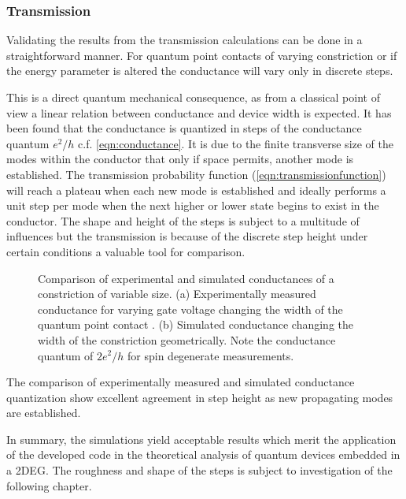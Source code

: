 \subsubsection{Transmission}
Validating the results from the transmission calculations can be done in a straightforward manner. For quantum point contacts of varying constriction or if the energy parameter is altered the conductance will vary only in discrete steps.\par
This is a direct quantum mechanical consequence, as from a classical point of view a linear relation between conductance and device width is expected.
It has been found that the conductance is quantized in steps of the conductance quantum $e^2/h$ c.f. \cref{eqn:conductance}.
It is due to the finite transverse size of the modes within the conductor that only if space permits, another mode is established. The transmission probability function (\cref{eqn:transmissionfunction}) will reach a plateau when each new mode is established and ideally performs a unit step per mode when the next higher or lower state begins to exist in the conductor. The shape and height of the steps is subject to a multitude of influences but the transmission is because of the discrete step height under certain conditions a valuable tool for comparison.\par
\begin{figure}[h]
  \begin{center}
    \caption{Comparison of experimental and simulated conductances of a constriction of variable size. (a) Experimentally measured conductance for varying gate voltage changing the width of the quantum point contact \cite{PhysRevLett.60.848}. (b) Simulated conductance changing the width of the constriction geometrically. Note the conductance quantum of $2e^2/h$ for spin degenerate measurements.}
\end{center}
\end{figure}
The comparison of experimentally measured and simulated conductance quantization show excellent agreement in step height as new propagating modes are established.\par
In summary, the simulations yield acceptable results which merit the application of the developed code in the theoretical analysis of quantum devices embedded in a 2DEG.
The roughness and shape of the steps is subject to investigation of the following chapter.\par
\FloatBarrier
